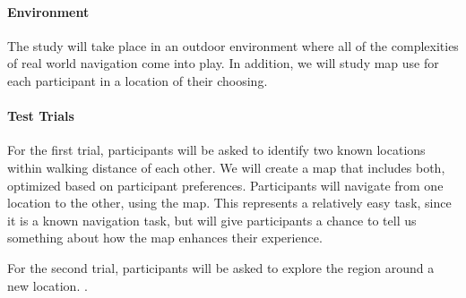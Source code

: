 \paragraph{Environment}
The study will take place in an outdoor environment where all of the complexities of real world navigation come into play. In addition, we will study map use for each participant in a location of their choosing.

\paragraph{Test Trials}
For the first trial, participants will be asked to identify two known locations within walking distance of each other. We will create a map that includes both, optimized based on participant preferences. Participants will navigate from one location to the other, using the map. This represents a relatively easy task, since it is a known navigation task, but will give participants a chance to tell us something about how the map enhances their experience.

For the second trial, participants will be asked to explore the region around a new location. .


